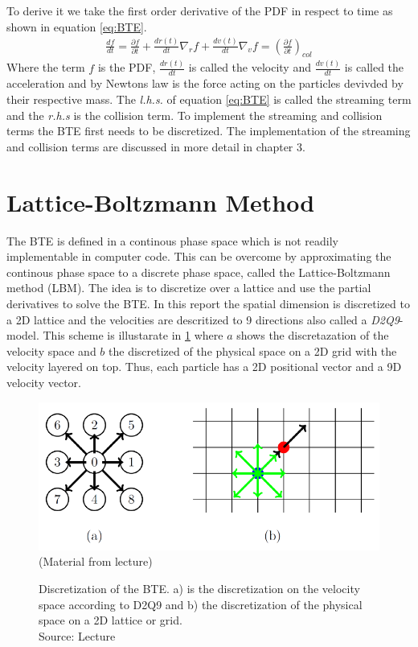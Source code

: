 To derive it we take the first order derivative of the PDF in respect to time as shown in
equation \ref{eq:BTE}.
\begin{equation}
  \label{eq:BTE}
  \begin{aligned}
    \frac{df}{dt} =\frac{\partial f}{\partial t} + \frac{dr(t)}{dt} \nabla_{r}f + \frac{dv(t)}{dt} \nabla_{v}f = \left( \frac{\partial f}{\partial t} \right)_{col}
  \end{aligned}
\end{equation}
Where the term $f$ is the PDF, $\frac{dr(t)}{dt}$ is called the velocity and $\frac{dv(t)}{dt}$ is called the acceleration and by Newtons law is the force acting on the particles devivded by their respective mass.
The \textit{l.h.s.} of equation \ref{eq:BTE} is called the streaming term and the \textit{r.h.s} is the collision term.
To implement the streaming and collision terms the BTE first needs to be discretized.
The implementation of the streaming and collision terms are discussed in more detail in chapter 3.


\section{Lattice-Boltzmann Method} \label{sec:lbm}
The BTE is defined in a continous phase space which is not readily implementable in computer code.
This can be overcome by approximating the continous phase space to a discrete phase space, called the Lattice-Boltzmann method (LBM).
The idea is to discretize over a lattice and use the partial derivatives to solve the BTE.
In this report the spatial dimension is discretized to a 2D lattice and the velocities are descritized to 9 directions also called a \textit{D2Q9}-model.
This scheme is illustarate in \ref{fig:d2q9-scheme} where $a$ shows the discretazation of the velocity space and $b$ the discretized of the physical space on a 2D grid with the velocity layered on top. Thus, each particle has a 2D positional vector and a 9D velocity vector.
\begin{figure}[h]
  \centering
  \includegraphics[width=0.8\columnwidth]{d2q9_scheme.png}\\
  \small{(Material from lecture)}
  \caption[Discretization of the BTE]{Discretization of the BTE. a) is the discretization on the velocity space according to D2Q9 and b) the discretization of the physical space on a  2D lattice or grid.\\
  Source: Lecture}
  \label{fig:d2q9-scheme}
\end{figure}




